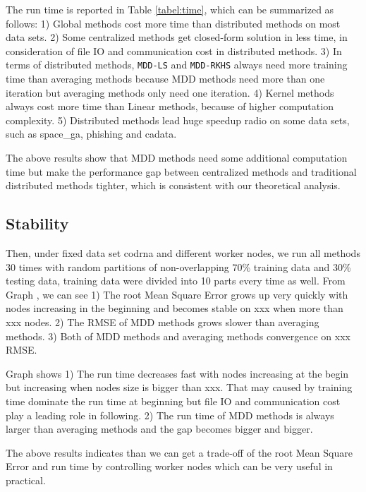 \documentclass{article}
\begin{document}
The run time is reported in Table \ref{tabel:time},
which can be summarized as follows:
1) Global methods cost more time than distributed methods on most data sets.
2) Some centralized methods get closed-form solution in less time, in consideration of file IO and communication cost in distributed methods.
3) In terms of distributed methods, \texttt{MDD-LS} and \texttt{MDD-RKHS} always need more training time
than averaging methods because MDD methods need more than one iteration but averaging methods only need one iteration.
4) Kernel methods always cost more time than Linear methods, because of higher computation complexity.
5) Distributed methods lead huge speedup radio on some data sets, such as space\_ga, phishing and cadata.

The above results show that MDD methods need some additional computation
time but make the performance gap between centralized methods and traditional distributed methods tighter,
which is consistent with our theoretical analysis.

\subsection{Stability}
Then, under fixed data set cod\-rna and different worker nodes, we run all methods 30 times with random partitions of non-overlapping 70\% training data and 30\% testing data, training data were divided into 10 parts every time as well.
From Graph \cite{graph:mse}, we can see 1) The root Mean Square Error grows up very quickly with nodes increasing in the beginning and becomes stable on xxx when more than xxx nodes. 2) The RMSE of MDD methods grows slower than averaging methods. 3) Both of MDD methods and averaging methods convergence on xxx RMSE.


Graph \cite{graph:time} shows 1) The run time decreases fast with nodes increasing at the begin but increasing when nodes size is bigger than xxx. That may caused by training time dominate the run time at beginning but file IO and communication cost play a leading role in following. 2) The run time of MDD methods is always larger than averaging methods and the gap becomes bigger and bigger.

The above results indicates than we can get a trade-off of the root Mean Square Error and run time by controlling worker nodes which can be very useful in practical.


\end{document}
